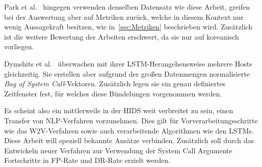         Park et al.~\cite{PARK2021} hingegen verwenden denselben Datensatz wie diese Arbeit, greifen bei der Auswertung aber auf Metriken zurück, welche in diesem Kontext nur wenig Aussagekraft besitzen, wie in~\autoref{sec:Metriken} beschrieben wird.
        Zusätzlich ist die weitere Bewertung der Arbeiten erschwert, da sie nur auf koreanisch vorliegen.\par\medskip

        Dymshits et al.~\cite{LSTMDYMSHITS2017} überwachen mit ihrer LSTM-Herangehensweise mehrere Hosts gleichzeitig.
        Sie erstellen aber aufgrund der großen Datenmengen normalisierte \textit{Bag of System Call}-Vektoren.
        Zusätzlich legen sie ein genau definiertes Zeitfenster fest, für welches diese Bündelungen vorgenommen werden.\par\medskip

        Es scheint also ein mittlerweile in der \ac{HIDS} weit verbreitet zu sein, einen Transfer von \ac{NLP}-Verfahren vorzunehmen.
        Dies gilt für Vorverarbeitungsschritte wie das \ac{W2V}-Verfahren sowie auch verarbeitende Algorithmen wie den \acp{LSTM}.
        Diese Arbeit will speziell bekannte Ansätze verbinden.
        Zusätzlich soll durch das Entwickeln neuer Verfahren zur Verwendung der System Call Argumente Fortschritte in \ac{FP}-Rate und \ac{DR}-Rate erzielt werden.





